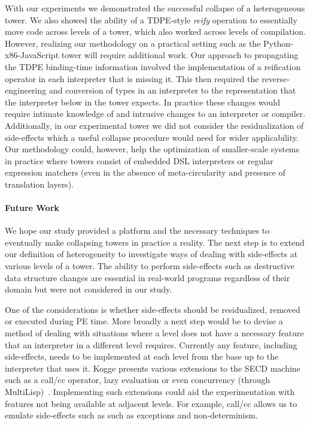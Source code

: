 \documentclass[sigplan,anonymous,review]{acmart}
\theoremstyle{definition}
\begin{document}
With our experiments we demonstrated the successful collapse of a heterogeneous tower. We also showed the ability of a TDPE-style \textit{reify} operation to essentially move code across levels of a tower, which also worked across levels of compilation. However, realizing our methodology on a practical setting such as the Python-x86-JavaScript tower will require additional work. Our approach to propagating the TDPE binding-time information involved the implementation of a reification operator in each interpreter that is missing it. This then required the reverse-engineering and conversion of types in an interpreter to the representation that the interpreter below in the tower expects. In practice these changes would require intimate knowledge of and intrusive changes to an interpreter or compiler. Additionally, in our experimental tower we did not consider the residualization of side-effects which a useful collapse procedure would need for wider applicability. Our methodology could, however, help the optimization of smaller-scale systems in practice where towers consist of embedded DSL interpreters or regular expression matchers (even in the absence of meta-circularity and presence of translation layers).

\paragraph{Future Work}

We hope our study provided a platform and the necessary techniques to eventually make collapsing towers in practice a reality. The next step is to extend our definition of heterogeneity to investigate ways of dealing with side-effects at various levels of a tower. The ability to perform side-effects such as destructive data structure changes are essential in real-world programs regardless of their domain but were not considered in our study.

One of the considerations is whether side-effects should be residualized, removed or executed during PE time. More broadly a next step would be to devise a method of dealing with situations where a level does not have a necessary feature that an interpreter in a different level requires.
Currently any feature, including side-effects, needs to be implemented at each level from the base up to the interpreter that uses it.
Kogge presents various extensions to the SECD machine such as a call/cc operator, lazy evaluation or even concurrency (through MultiLisp)~\cite{kogge1990architecture}. Implementing such extensions could aid the experimentation with features not being available at adjacent levels. For example, call/cc allows us to emulate side-effects such as such as exceptions and non-determinism.
\end{document}
